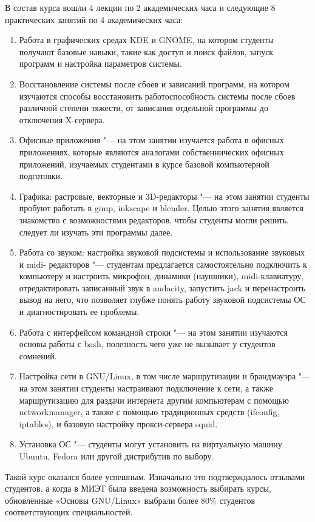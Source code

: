 \documentclass[10pt, a5paper]{article}
\begin{document}
В состав курса вошли 4 лекции по 2 академических часа и следующие 8 практических занятий по 4 академических часа:

\begin{enumerate}
  \item Работа в графических средах KDE и GNOME, на котором студенты получают базовые навыки, такие как доступ и поиск файлов, запуск программ и настройка параметров системы.
  \item Восстановление системы после сбоев и зависаний программ, на котором изучаются способы восстановить работоспособность системы после сбоев различной степени тяжести, от зависания отдельной программы до отключения X-сервера.
  \item Офисные приложения "--- на этом занятии изучается работа в офисных приложениях, которые являются аналогами собственнических офисных приложений, изучаемых студентами в курсе базовой компьютерной подготовки.
  \item Графика: растровые, векторные и 3D-редакторы "--- на этом занятии студенты пробуют работать в gimp, inkscape и blender. Целью этого занятия является знакомство с возможностями редакторов, чтобы студенты могли решить, следует ли изучать эти программы далее.
  \item Работа со звуком: настройка звуковой подсистемы и использование звуковых и midi- редакторов "--- студентам предлагается самостоятельно подключить к компьютеру и настроить микрофон, динамики (наушники), midi-клавиатуру, отредактировать записанный звук в audacity, запустить jack и перенастроить вывод на него, что позволяет глубже понять работу звуковой подсистемы ОС и диагностировать ее проблемы.
  \item Работа с интерфейсом командной строки "--- на этом занятии изучаются основы работы с bash, полезность чего уже не вызывает у студентов сомнений.
  \item Настройка сети в GNU/Linux, в том числе маршрутизации и брандмауэра "--- на этом занятии студенты настраивают подключение к сети, а также маршрутизацию для раздачи интернета другим компьютерам с помощью networkmanager, а также с помощью традиционных средств (ifconfig, iptables), и базовую настройку прокси-сервера squid.
  \item Установка ОС "--- студенты могут установить на виртуальную машину Ubuntu, Fedora или другой дистрибутив по выбору.
\end{enumerate}

Такой курс оказался более успешным. Изначально это подтверждалось отзывами студентов, а когда в МИЭТ была введена возможность выбирать курсы, обновлённые «Основы \linebreak GNU/Linux» выбрали более 80\% студентов соответствующих специальностей.
\end{document}
